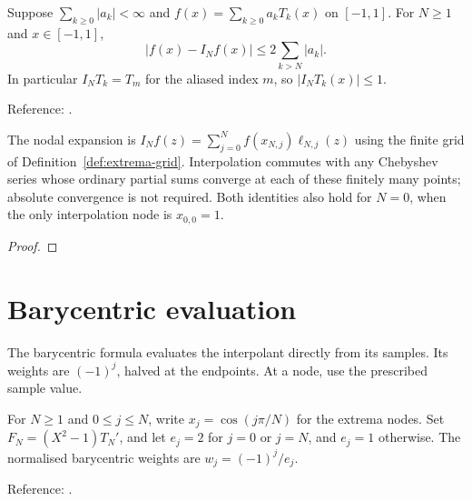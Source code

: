 \begin{theorem}
\label{thm:interpolation-tail}
\leanok
Suppose $\sum_{k\ge0}|a_k|<\infty$ and $f(x)=\sum_{k\ge0}a_kT_k(x)$ on
$[-1,1]$. For $N\ge1$ and $x\in[-1,1]$,
\[
 |f(x)-I_Nf(x)|\le2\sum_{k>N}|a_k|.
\]
In particular $I_NT_k=T_m$ for the aliased index $m$, so $|I_NT_k(x)|\le1$.

Reference: \cite[Chapter 4]{atap}.

The nodal expansion is
$I_N f(z)=\sum_{j=0}^{N} f(x_{N,j})\ell_{N,j}(z)$ using the finite grid of
Definition~\ref{def:extrema-grid}. Interpolation commutes with any Chebyshev
series whose ordinary partial sums converge at each of these finitely many points; absolute convergence is not required. Both identities also
hold for $N=0$, when the only interpolation node is $x_{0,0}=1$.
\end{theorem}
\begin{proof}
\leanok
\end{proof}

\section{Barycentric evaluation}\label{sec:textbook-interpolation-barycentric}

The barycentric formula evaluates the interpolant directly from its samples. Its weights are $(-1)^j$, halved at the endpoints. At a node, use the prescribed sample value.

\begin{definition}
\label{def:extrema-barycentric}
\leanok
For $N\ge1$ and $0\le j\le N$, write $x_j=\cos(j\pi/N)$ for the extrema nodes. Set
$F_N=(X^2-1)T_N'$, and let $e_j=2$ for $j=0$ or $j=N$, and $e_j=1$ otherwise.
The normalised barycentric weights are $w_j=(-1)^j/e_j$.

Reference: \cite[Theorem 5.2]{atap}.
\end{definition}

